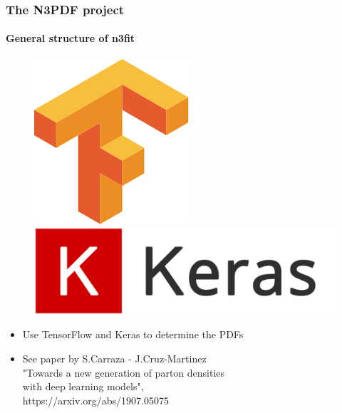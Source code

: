 \documentclass[aspectratio=43]{beamer}
\begin{document}
\begin{frame}

	\frametitle{The N3PDF project}
	\framesubtitle{General structure of n3fit}

	\begin{figure}[!htb]
		\includegraphics[width = 0.5\linewidth]{TF.png}
		\endminipage\hfill
		\includegraphics[width = 0.5\linewidth]{Keras.png}
		\endminipage\hfill
	\end{figure}

	\begin{itemize}
		\item Use TensorFlow and Keras to determine the PDFs
		\item See paper by S.Carraza - J.Cruz-Martinez \\
		{\color{blue}"Towards a new generation of parton densities\\ with deep learning models",\\ https://arxiv.org/abs/1907.05075}
	\end{itemize}

\end{frame}
\end{document}
